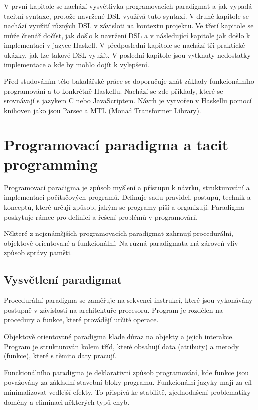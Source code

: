 \documentclass[male,czech]{kithesis}
\begin{document}
V první kapitole se nachází vysvětlivka programovacích paradigmat a 
jak vypadá tacitní syntaxe, 
protože navržené DSL využívá tuto syntaxi. 
V druhé kapitole se nachází využití různých DSL v závisloti na kontextu projektu.
Ve třetí kapitole se může čtenář dočíst, 
jak došlo k navržení DSL a 
v následující kapitole jak došlo k implementaci v jazyce Haskell.
V předposlední kapitole se nachází tři praktické ukázky, 
jak lze takové DSL využít.
V poslední kapitole jsou vytknuty nedostatky implementace a
kde by mohlo dojít k vylepšení. 

Před studováním této bakalářské práce se doporučuje znát základy funkcionálního programování a
to konkrétně Haskellu.
Nachází se zde příklady,
které se srovnávají s jazykem C nebo JavaScriptem.
Návrh je vytvořen v Haskellu pomocí knihoven jako
jsou Parsec a MTL (Monad Transformer Library).

\chapter{Programovací paradigma a tacit programming}

Programovací paradigma je způsob myšlení a přístupu k návrhu, 
strukturování a 
implementaci počítačových programů. 
Definuje sadu pravidel, postupů, technik a konceptů, 
které určují způsob,
jakým se programy píší a organizují. 
Paradigma poskytuje rámec pro definici a 
řešení problémů v programování.

Některé z nejznámějších programovacích paradigmat zahrnují 
procedurální, objektově orientované a funkcionální.
Na různá paradigmata má zároveň vliv způsob 
správy paměti.

\section{Vysvětlení paradigmat}

Procedurální paradigma se zaměřuje na sekvenci instrukcí, 
které jsou vykonávány postupně
v závislosti na architektuře procesoru.
Program je rozdělen na procedury a funkce, 
které provádějí určité operace. 

Objektově orientované paradigma klade důraz na objekty a
jejich interakce. 
Program je strukturován kolem tříd, 
které obsahují data (atributy) a 
metody (funkce), 
které s těmito daty pracují. 

Funckionálního paradigma je deklarativní způsob programování, 
kde funkce jsou považovány za základní stavební bloky programu. 
Funkcionální jazyky mají za cíl minimalizovat vedlejší efekty.
To přispívá ke stabilitě, zjednodušení problematiky domény a 
eliminaci některých typů chyb. 
\end{document}
